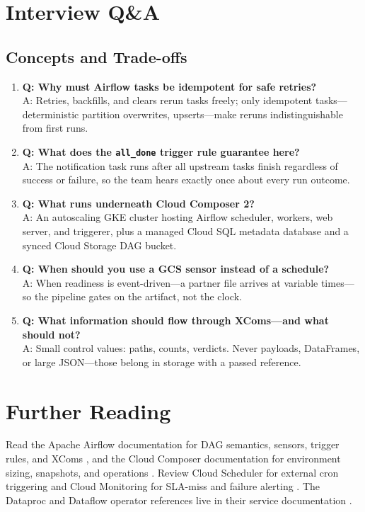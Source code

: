 \section{Interview Q\&A}
\subsection{Concepts and Trade-offs}
\begin{enumerate}
    \item \textbf{Q: Why must Airflow tasks be idempotent for safe retries?}\\
    A: Retries, backfills, and clears rerun tasks freely; only idempotent tasks---deterministic partition overwrites, upserts---make reruns indistinguishable from first runs.

    \item \textbf{Q: What does the \texttt{all\_done} trigger rule guarantee here?}\\
    A: The notification task runs after all upstream tasks finish regardless of success or failure, so the team hears exactly once about every run outcome.

    \item \textbf{Q: What runs underneath Cloud Composer 2?}\\
    A: An autoscaling GKE cluster hosting Airflow scheduler, workers, web server, and triggerer, plus a managed Cloud SQL metadata database and a synced Cloud Storage DAG bucket.

    \item \textbf{Q: When should you use a GCS sensor instead of a schedule?}\\
    A: When readiness is event-driven---a partner file arrives at variable times---so the pipeline gates on the artifact, not the clock.

    \item \textbf{Q: What information should flow through XComs---and what should not?}\\
    A: Small control values: paths, counts, verdicts. Never payloads, DataFrames, or large JSON---those belong in storage with a passed reference.
\end{enumerate}

\section{Further Reading}
Read the Apache Airflow documentation for DAG semantics, sensors, trigger rules, and XComs \cite{apacheairflowdocs}, and the Cloud Composer documentation for environment sizing, snapshots, and operations \cite{googlecloudcomposerdocs}. Review Cloud Scheduler for external cron triggering \cite{googlecloudschedulerdocs} and Cloud Monitoring for SLA-miss and failure alerting \cite{googlecloudmonitoringdocs}. The Dataproc and Dataflow operator references live in their service documentation \cite{googleclouddataprocdocs,googleclouddataflowdocs}.

